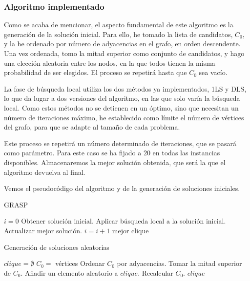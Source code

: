 \subsubsection{Algoritmo implementado}

Como se acaba de mencionar, el aspecto fundamental de este algoritmo es la generación de
la solución inicial. Para ello, he tomado la lista de candidatos, $C_0$, y la he ordenado
por número de adyacencias en el grafo, en orden descendente. Una vez ordenada, tomo la
mitad superior como conjunto de candidatos, y hago una elección aleatoria entre los nodos,
en la que todos tienen la misma probabilidad de ser elegidos. El proceso se repetirá hasta
que $C_0$ sea vacío.

La fase de búsqueda local utiliza los dos métodos ya implementados, 1LS y DLS, lo que da lugar a
dos versiones del algoritmo, en las que solo varía la búsqueda local. Como estos métodos
no se detienen en un óptimo, sino que necesitan un número de iteraciones máximo, he
establecido como límite el número de vértices del grafo, para que se adapte al tamaño
de cada problema.

Este proceso se repetirá un número determinado de iteraciones, que se pasará como parámetro.
Para este caso se ha fijado a $20$ en todas las instancias disponibles. Almacenaremos la
mejor solución obtenida, que será la que el algoritmo devuelva al final.

Vemos el pseudocódigo del algoritmo y de la generación de soluciones iniciales.

\begin{algorithm}[H]
\caption{GRASP}
  \begin{algorithmic}
    \State $i = 0$
  \Repeat
    \State Obtener solución inicial.
    \State Aplicar búsqueda local a la solución inicial.
    \State Actualizar mejor solución.
    \State $i = i+1$
  \Return mejor clique
  \EndFunction
  \end{algorithmic}
\end{algorithm}

\begin{algorithm}[H]
\caption{Generación de soluciones aleatorias}
  \begin{algorithmic}
    \State $clique = \emptyset$
    \State $C_0 =$ vértices
    \Repeat
      \State Ordenar $C_0$ por adyacencias.
      \State Tomar la mitad superior de $C_0$.
      \State Añadir un elemento aleatorio a $clique$.
      \State Recalcular $C_0$.
    \Return $clique$
  \end{algorithmic}
\end{algorithm}


